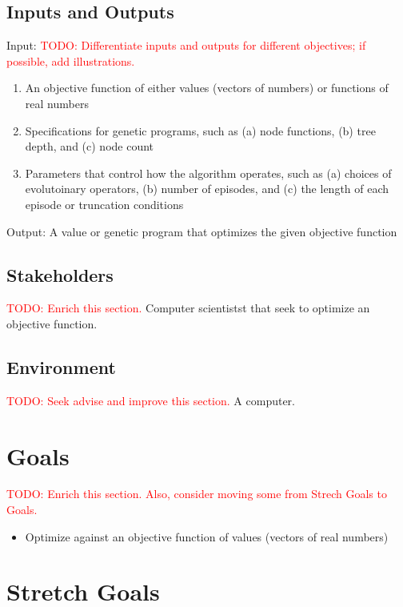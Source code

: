 \documentclass{article}
\begin{document}
\subsection{Inputs and Outputs}

Input: 
\textcolor{red}{TODO: Differentiate inputs and outputs for different objectives; if possible, add illustrations.}
\begin{enumerate}
    \item An objective function of either values (vectors of numbers) or functions of real numbers
    \item Specifications for genetic programs, such as (a) node functions, (b) tree depth, and (c) node count
    \item Parameters that control how the algorithm operates, such as (a) choices of evolutoinary operators, (b) number of episodes, and (c) the length of each episode or truncation conditions
\end{enumerate}


Output: A value or genetic program that optimizes the given objective function


\subsection{Stakeholders}
\textcolor{red}{TODO: Enrich this section.}
Computer scientistst that seek to optimize an objective function.

\subsection{Environment}

\textcolor{red}{TODO: Seek advise and improve this section.}
A computer.

\section{Goals}

\textcolor{red}{TODO: Enrich this section. Also, consider moving some from Strech Goals to Goals.}
\begin{itemize}
    \item Optimize against an objective function of values (vectors of real numbers)
\end{itemize}

\section{Stretch Goals}
\end{document}
